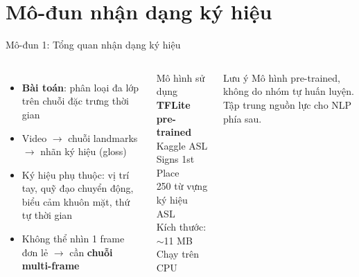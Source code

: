 ﻿\documentclass[aspectratio=169, 11pt]{beamer}
\begin{document}
\section{Mô-đun nhận dạng ký hiệu}

\begin{frame}{Mô-đun 1: Tổng quan nhận dạng ký hiệu}
    \begin{columns}[T]
        \begin{itemize}
            \item \textbf{Bài toán}: phân loại đa lớp trên chuỗi đặc trưng thời gian
            \item Video $\rightarrow$ chuỗi landmarks $\rightarrow$ nhãn ký hiệu (gloss)
            \item Ký hiệu phụ thuộc: vị trí tay, quỹ đạo chuyển động, biểu cảm khuôn mặt, thứ tự thời gian
            \item Không thể nhìn 1 frame đơn lẻ $\rightarrow$ cần \textbf{chuỗi multi-frame}
        \end{itemize}

        \begin{block}{Mô hình sử dụng}
            \small\textbf{TFLite pre-trained}\\
            Kaggle ASL Signs 1st Place\\[4pt]
            250 từ vựng ký hiệu ASL\\
            Kích thước: $\sim$11 MB\\
            Chạy trên CPU
        \end{block}
        \vspace{0.15cm}
        \begin{alertblock}{\small Lưu ý}
            \scriptsize Mô hình pre-trained, không do nhóm tự huấn luyện. Tập trung nguồn lực cho NLP phía sau.
        \end{alertblock}
    \end{columns}
\end{frame}
\end{document}
